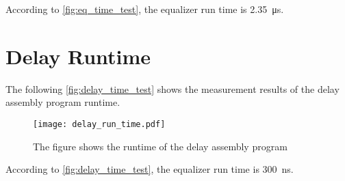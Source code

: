 According to \autoref{fig:eq_time_test}, the equalizer run time is \SI{2.35}{\micro\second}.

\section*{Delay Runtime}
The following \autoref{fig:delay_time_test} shows the measurement results of the delay assembly program runtime.
\begin{figure}[H]
	\centering
		\texttt{[image: delay\_run\_time.pdf]}
		\caption{The figure shows the runtime of the delay assembly program}
		\label{fig:delay_time_test}
\end{figure}

According to \autoref{fig:delay_time_test}, the equalizer run time is \SI{300}{\nano\second}.